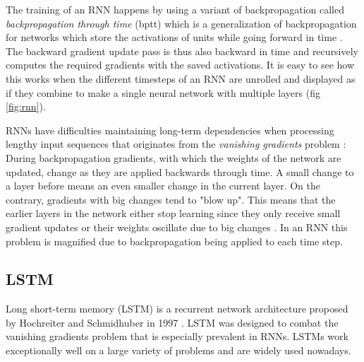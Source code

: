 The training of an RNN happens by using a variant of backpropagation called \textit{backpropagation through time} (bptt) which is a generalization of backpropagation for networks which store the activations of units while going forward in time \cite{rumelhart1985}.
The backward gradient update pass is thus also backward in time and recursively computes the required gradients with the saved activations.
It is easy to see how this works when the different timesteps of an RNN are unrolled and displayed as if they combine to make a single neural network with multiple layers (fig \ref{fig:rnn}).

RNNs have difficulties maintaining long-term dependencies when processing lengthy input sequences that originates from the \textit{vanishing gradients} problem \cite{bengio1994}:
During backpropagation gradients, with which the weights of the network are updated, change as they are applied backwards through time.
A small change to a layer before means an even smaller change in the current layer.
On the contrary, gradients with big changes tend to "blow up".
This means that the earlier layers in the network either stop learning since they only receive small gradient updates or their weights oscillate due to big changes \cite{hochreiter1997}.
In an RNN this problem is magnified due to backpropagation being applied to each time step.

\subsection{LSTM} \label{LSTM}
Long short-term memory (LSTM) is a recurrent network architecture proposed by Hochreiter and Schmidhuber in 1997 \cite{hochreiter1997}.
LSTM was designed to combat the vanishing gradients problem that is especially prevalent in RNNs.
LSTMs work exceptionally well on a large variety of problems and are widely used nowadays.

